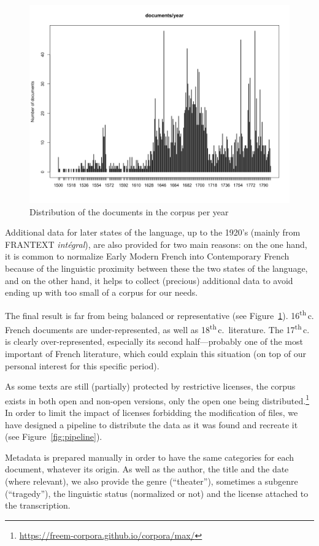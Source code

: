 \begin{figure}[ht]
    \centering
    \includegraphics[width=0.75\linewidth]{static/media/mod_eval/dalembert/desc_DalemBERT.png}
    \caption{Distribution of the documents in the \freemmax corpus per year}
    \label{fig:FreEMmax_desc}
\end{figure}

Additional data for later states of the language, up to the 1920's (mainly from FRANTEXT \emph{intégral}), are also provided for two main reasons: on the one hand, it is common to normalize Early Modern French into Contemporary French \citep{gabay-2014-pourquoi} because of the linguistic proximity between these the two states of the language, and on the other hand, it helps to collect (precious) additional data to avoid ending up with too small of a corpus for our needs.

The final result is far from being balanced or representative (see Figure~\ref{fig:FreEMmax_desc}). 16\textsuperscript{th}\,c. French documents are under-represented, as well as 18\textsuperscript{th}\,c.~literature. The 17\textsuperscript{th}\,c. is clearly over-represented, especially its second half---probably one of the most important of French literature, which could explain this situation (on top of our personal interest for this specific period).

As some texts are still (partially) protected by restrictive licenses, the \freemmax corpus exists in both open and non-open versions, only the open one being distributed.\footnote{\url{https://freem-corpora.github.io/corpora/max/}} In order to limit the impact of licenses forbidding the modification of files, we have designed a pipeline to distribute the data as it was found and recreate it (see Figure~\ref{fig:pipeline}).

Metadata is prepared manually in order to have the same categories for each document, whatever its origin. As well as the author, the title and the date (where relevant), we also provide the genre (``theater''), sometimes a subgenre (``tragedy''), the linguistic status (normalized or not) and the license attached to the transcription.

